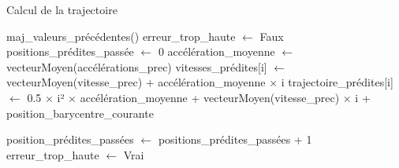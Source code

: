\documentclass{article}
\begin{document}
\begin{algorithm}[H]
    \caption{Calcul de la trajectoire}
    \begin{algorithmic}

        \STATE maj\_valeurs\_précédentes()
        \medbreak
        \medbreak
        \STATE erreur\_trop\_haute $\leftarrow$ Faux
        \STATE positions\_prédites\_passée $\leftarrow$ 0
        \STATE accélération\_moyenne $\leftarrow$ vecteurMoyen(accélérations\_prec)
        \medbreak
        \STATE vitesses\_prédites[i] $\leftarrow$ vecteurMoyen(vitesse\_prec) + accélération\_moyenne $\times$ i
        \STATE trajectoire\_prédites[i] $\leftarrow$ 0.5 $\times$ i² $\times$ accélération\_moyenne + vecteurMoyen(vitesse\_prec) $\times$ i + position\_barycentre\_courante

        \ENDFOR
        \medbreak
        \ELSE

        \STATE position\_prédites\_passées $\leftarrow$ positions\_prédites\_passées + 1
        \ENDIF
        \medbreak
        \STATE erreur\_trop\_haute $\leftarrow$ Vrai
        \ENDIF
        \ENDIF

    \end{algorithmic}
\end{algorithm}
\end{document}
